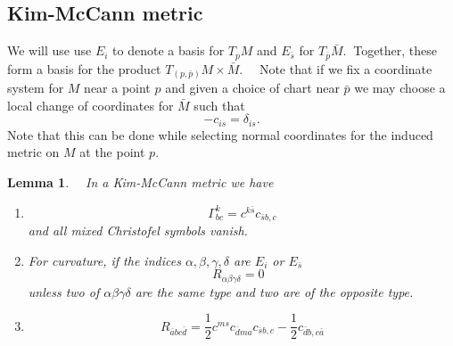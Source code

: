 \documentclass[12pt,letterpaper]{amsart}%
\newcounter{mycounter}
\numberwithin{mycounter}{section}
\theoremstyle{plain}
\newtheorem{lemma}[mycounter]{Lemma}
\numberwithin{equation}{section}
\theoremstyle{definition}
\begin{document}
\iffalse
\subsection{Kim-McCann metric}

We will use use $E_{i}$ to denote a basis for $T_{p}M$ and $E_{\bar{s}}$ 
for $T_{\bar{p}}\bar{M}$. $\ $Together, these form a basis for the product
$T_{\left(  p,\bar{p}\right)  }M\times\bar{M}.$ \ \ Note that if we fix a
coordinate system for $M$ near a point $p$ and given a choice of chart near
$\bar{p}$ we may choose a local change of coordinates for $\bar{M}$ such that
\[
-c_{is}=\delta_{is}.
\]
Note that this can be done while selecting normal coordinates for the induced metric on $M$ at the point $p$.

\begin{lemma}
\cite[Lemma 4.1]{KM} \label{KM41} \ \ In a Kim-McCann metric we have

\begin{enumerate}
\item
\[
\Gamma_{bc}^{k}=c^{k\bar{s}}c_{\bar{s}b,c}%
\]
and all mixed Christofel symbols vanish.

\item For curvature, if the indices $\alpha,\beta,\gamma,\delta$ are $E_{i}$
or $E_{\bar{s}}$ \
\[
R_{\alpha\beta\gamma\delta}=0\text{ }%
\]
unless two of $\alpha\beta\gamma\delta$ are the same type and two are of the
opposite type.

\item
\[
R_{\bar{a}bc\bar{d}}=\frac{1}{2}c^{ms}c_{\bar{d}ma}c_{\bar{s}b,c}-\frac{1}%
{2}c_{\bar{d}b,c\bar{a}}%
\]

\end{enumerate}
\end{lemma}
\end{document}
